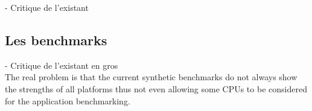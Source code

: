 - Critique de l'existant\\


\subsection{Les benchmarks}

- Critique de l'existant en gros\\

    The real problem is that the current synthetic benchmarks do not always show the strengths of all platforms thus not even allowing some CPUs to be considered for the application benchmarking.










\printbibliography[heading=references,segment=\therefsegment]

